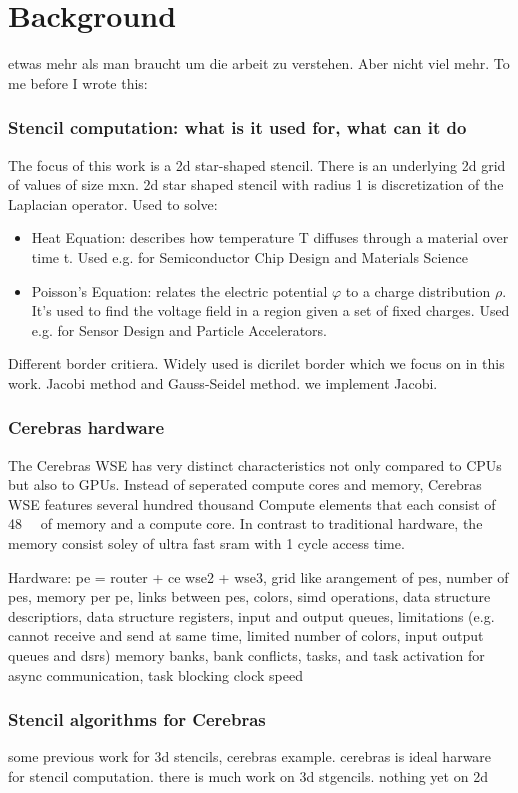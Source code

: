 \chapter{Background}
etwas mehr als man braucht um die arbeit zu verstehen. Aber nicht viel mehr.
To me before I wrote this:
\subsection{Stencil computation: what is it used for, what can it do}
The focus of this work is a 2d star-shaped stencil. There is an underlying 2d grid of values of size mxn.  
2d star shaped stencil with radius 1 is discretization of the Laplacian operator.
Used to solve:
\begin{itemize}
    \item Heat Equation: describes how temperature T diffuses through a material over time t. Used e.g. for Semiconductor Chip Design and Materials Science
    \item Poisson's Equation: relates the electric potential $\varphi$ to a charge distribution $\rho$. It's used to find the voltage field in a region given a set of fixed charges. Used e.g. for Sensor Design and Particle Accelerators.
\end{itemize}
Different border critiera. Widely used is dicrilet border which we focus on in this work.
Jacobi method and Gauss-Seidel method. we implement Jacobi.
\subsection{Cerebras hardware}
The Cerebras \ac{WSE} has very distinct characteristics not only compared to \acp{CPU} but also to \acp{GPU}.
Instead of seperated compute cores and memory, Cerebras \ac{WSE} features several hundred thousand Compute elements that each consist of \qty{48}{\kilo\byte} of memory and a compute core. In contrast to traditional hardware, the memory consist soley of ultra fast \ac{sram} with 1 cycle access time.







Hardware: \ac{pe} = router + \ac{ce}
wse2 + wse3, grid like arangement of \acp{pe}, number of \acp{pe}, memory per \ac{pe}, links between \acp{pe}, colors, simd operations, data structure descriptiors, data structure registers, input and output queues, limitations (e.g. cannot receive and send at same time, limited number of colors, input output queues and dsrs)
memory banks, bank conflicts, 
tasks, and task activation for async communication, task blocking
clock speed
\subsection{Stencil algorithms for Cerebras}
some previous work for 3d stencils, cerebras example.
cerebras is ideal harware for stencil computation. 
there is much work on 3d stgencils. nothing yet on 2d 